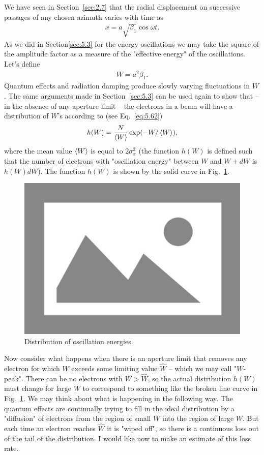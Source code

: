 We have seen in Section~\ref{sec:2.7} that the radial displacement on successive passages of any chosen azimuth varies with time as
\begin{align}
	x = a \sqrt{\beta_1} \cos\omega t.
\end{align}
As we did in Section\ref{sec:5.3} for the energy oscillations we may take the square of the
amplitude factor as a measure of the "effective energy" of the oscillations. Let's define
\begin{align}
	W = a^2 \beta_1.
\end{align}
Quantum effects and radiation damping produce slowly varying fluctuations in $W$. The same arguments made in Section~\ref{sec:5.3} can be used again to show that -- in the absence of any aperture limit -- the electrons in a beam will have a distribution of $W$'s according to (see Eq.~\eqref{eq:5.62})
\begin{align}\label{eq:5.120}
	h(W) = \dfrac{N}{\left< W \right>}\exp(-W/\left< W \right>),
\end{align}
where the mean value $\left< W \right>$ is equal to $2\sigma_x^2$ (the function $h(W)$ is defined such
that the number of electrons with "oscillation energy" between $W$ and $W + dW$ is $h(W)dW$). The function $h(W)$ is shown by the solid curve in Fig.~\ref{fig:fig47}.
\begin{figure}[!htb]
	\centering
	\includegraphics[width=0.8\linewidth]{./Figuras/placeholder.png}
	\caption{Distribution of oscillation energies.}
	\label{fig:fig47}
\end{figure}
Now consider what happens when there is an aperture limit that removes any electron for which $W$ exceeds some limiting value $\hat{W}$ -- which we may call "$W$-peak". There can be no electrons with $W > \hat{W}$, so the actual distribution $h(W)$ must change for large $W$ to correspond to something like the broken line curve in Fig.~\ref{fig:fig47}. We may think about what is happening in the following way. The quantum effects are continually trying to fill in the ideal distribution by a "diffusion" of electrons from the region of small $W$ into the region of large $W$. But each time an electron reaches $\hat{W}$ it is "wiped off", so there is a continuous loss out of the tail of the distribution. I would like now to make an estimate of this loss rate.\\
